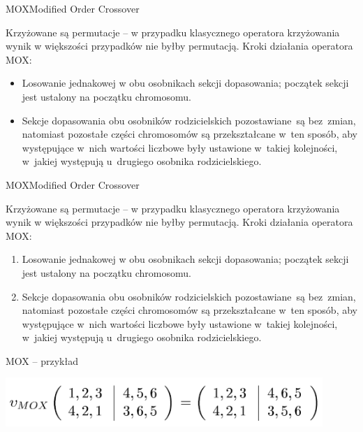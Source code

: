 \documentclass[10pt]{beamer}
\begin{document}
\begin{frame}{MOX}{Modified Order Crossover}
\begin{spacing}{1.5}
Krzyżowane są permutacje -- w przypadku klasycznego operatora krzyżowania wynik w większości przypadków nie byłby permutacją.
Kroki działania operatora MOX:\\
\begin{itemize}
\item Losowanie jednakowej w obu osobnikach sekcji dopasowania; początek sekcji jest ustalony na początku chromosomu.
\item Sekcje dopasowania obu osobników rodzicielskich pozostawiane~są bez~zmian, natomiast pozostałe części chromosomów są przekształcane w~ten sposób, aby występujące w~nich wartości liczbowe były ustawione w~takiej kolejności, w~jakiej występują u~drugiego osobnika rodzicielskiego.
\end{itemize}
\end{spacing}
\end{frame}

\begin{frame}{MOX}{Modified Order Crossover}
\begin{spacing}{1.5}
Krzyżowane są permutacje -- w przypadku klasycznego operatora krzyżowania wynik w większości przypadków nie byłby permutacją.
Kroki działania operatora MOX:\\
\begin{enumerate}
\item Losowanie jednakowej w obu osobnikach sekcji dopasowania; początek sekcji jest ustalony na początku chromosomu.
\item Sekcje dopasowania obu osobników rodzicielskich pozostawiane~są bez~zmian, natomiast pozostałe części chromosomów są przekształcane w~ten sposób, aby występujące w~nich wartości liczbowe były ustawione w~takiej kolejności, w~jakiej występują u~drugiego osobnika rodzicielskiego.
\end{enumerate}
\end{spacing}
\end{frame}


\begin{frame}{MOX -- przykład}
\begin{spacing}{1.5}
\begin{center}
\includegraphics[width=0.9\textwidth]{Grafiki/MOX.png}
\end{center}
\end{spacing}
\end{frame}
\end{document}
